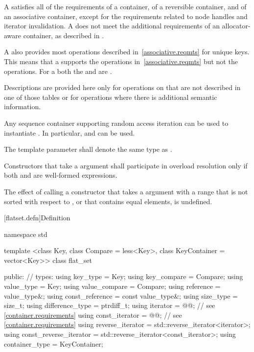 \begin{codeblock}
\begin{codeblock}
\begin{codeblock}
\begin{addedblock}
\pnum
A  satisfies all of the requirements of a container, of a
reversible container, and of an associative
container, except for the requirements related to
node handles and iterator
invalidation.  A  does not
meet the additional requirements of an allocator-aware container, as described
in .

\pnum
A  also provides most operations described
in~\ref{associative.reqmts} for unique keys.  This means that a
 supports the  operations
in~\ref{associative.reqmts} but not the  operations.  For a
 both the  and  are
.

\pnum
Descriptions are provided here only for operations on  that
are not described in one of those tables or for operations where there is
additional semantic information.

\pnum
Any sequence container supporting random access iteration can be used to
instantiate . In particular,  and
 can be used.

\pnum
The template parameter  shall denote the same type as
.

\pnum
Constructors that take a  argument  shall
participate in overload resolution only if both  and
 are well-formed expressions.

\pnum
The effect of calling a constructor that takes a 
argument with a range that is not sorted with respect to , or
that contains equal elements, is undefined.

[flatset.defn]{Definition}

\begin{codeblock}
namespace std {
  template <class Key, class Compare = less<Key>, class KeyContainer = vector<Key>>
  class flat_set {
  public:
    // types:
    using key_type                  = Key;
    using key_compare               = Compare;
    using value_type                = Key;
    using value_compare             = Compare;
    using reference                 = value_type&;
    using const_reference           = const value_type&;
    using size_type                 = size_t;
    using difference_type           = ptrdiff_t;
    using iterator                  = @@; // see \ref{container.requirements}
    using const_iterator            = @@; // see \ref{container.requirements}
    using reverse_iterator          = std::reverse_iterator<iterator>;
    using const_reverse_iterator    = std::reverse_iterator<const_iterator>;
    using container_type            = KeyContainer;

}}
\end{codeblock}
\end{addedblock}
\end{codeblock}
\end{codeblock}
\end{codeblock}
